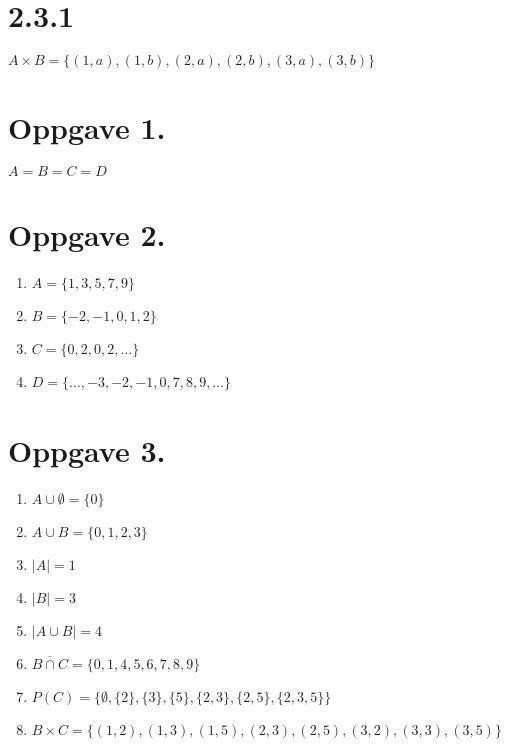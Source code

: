 \documentclass[12pt, a4paper]{article}
\begin{document}
\section*{2.3.1}
   $ A \times B = \{(1,a), (1,b), (2,a), (2,b), (3,a), (3,b)\} $

\newpage

\section*{Oppgave 1.}
   $ A = B = C = D $
\section*{Oppgave 2.}
   \begin{enumerate} [label=\alph*.]
      \item $ A = \{1, 3, 5, 7, 9\} $
      \item $ B = \{-2, -1, 0, 1, 2\} $
      \item $ C = \{0,2,0,2,\dots\} $
      \item $ D = \{\dots ,-3,-2,-1,0,7,8,9,\dots\} $
   \end{enumerate}

\section*{Oppgave 3.}
   \begin{enumerate} [label=\alph*.]
      \item $ A \cup \emptyset = \{0\} $
      \item $ A \cup B = \{0,1,2,3\} $
      \item $ \lvert A \rvert = 1 $
      \item $ \lvert B \rvert = 3 $
      \item $ \lvert A \cup B \rvert = 4 $
      \item $ \overline{B\cap C} = \{0,1,4,5,6,7,8,9\} $
      \item $ P(C) = \{\emptyset,\{2\},\{3\},\{5\},\{2,3\},\{2,5\},\{2,3,5\}\} $
      \item $ B \times C = \{(1,2), (1,3), (1,5), (2,3), (2,5), (3,2), (3,3), (3,5)\} $
   \end{enumerate}

\newpage
\end{document}
